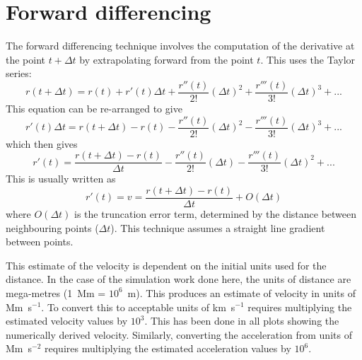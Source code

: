 \section{Forward differencing}
\label{sect:forward}

The forward differencing technique involves the computation of the derivative at the point $t + \Delta t$ by extrapolating forward from the point $t$. This uses the Taylor series:
\begin{equation}
r(t + \Delta t) = r(t) + r'(t)\Delta t +  \frac{r''(t)}{2!}(\Delta t)^{2} + \frac{r'''(t)}{3!}(\Delta t)^{3}  + ...
\end{equation}
This equation can be re-arranged to give
\begin{equation}
r'(t)\Delta t = r(t + \Delta t) - r(t) -  \frac{r''(t)}{2!}(\Delta t)^{2} - \frac{r'''(t)}{3!}(\Delta t)^{3}  + ...
\end{equation}
which then gives
\begin{equation}
r'(t) = \frac{r(t + \Delta t) - r(t)}{\Delta t} -  \frac{r''(t)}{2!}(\Delta t) - \frac{r'''(t)}{3!}(\Delta t)^{2}  + ...
\end{equation}
This is usually written as
\begin{equation}
r'(t) = v = \frac{r(t + \Delta t) - r(t)}{\Delta t} + O(\Delta t)
\end{equation}
where $O(\Delta t)$ is the truncation error term, determined by the distance between neighbouring points ($\Delta t$). This technique assumes a straight line gradient between points. 

This estimate of the velocity is dependent on the initial units used for the distance. In the case of the simulation work done here, the units of distance are mega-metres (1~Mm = $10^6$~m). This produces an estimate of velocity in units of Mm~s$^{-1}$. To convert this to acceptable units of km~s$^{-1}$ requires multiplying the estimated velocity values by $10^{3}$. This has been done in all plots showing the numerically derived velocity. Similarly, converting the acceleration from units of Mm~s$^{-2}$ requires multiplying the estimated acceleration values by $10^{6}$.


